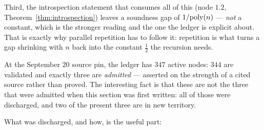 \begin{remark}
Third, the introspection statement that consumes all of this (node $1.2$,
Theorem~\ref{thm:introspection}) leaves a soundness gap of $1/\mathrm{poly}(n)$ --- \emph{not} a
constant, which is the stronger reading and the one the ledger is explicit about. That is
exactly why parallel repetition has to follow it: repetition is what turns a gap shrinking
with $n$ back into the constant $\frac12$ the recursion needs.
\end{remark}

\begin{remark}
\label{rem:admitted-nodes}
At the September 20 source pin, the ledger has $347$ active nodes:
$344$ are validated and exactly three are \emph{admitted} --- asserted on the strength of a
cited source rather than proved. The interesting fact is that these are not the three that
were admitted when this section was first written: all of those were discharged, and two of
the present three are in new territory.

What was discharged, and how, is the useful part:


\end{remark}
